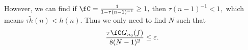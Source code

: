 %
%
%
%
%

However, we can find if $\fC =\frac{1}{1 - \tau (n-1)^{-1}} \ge 1,$ then $\tau (n-1)^{-1} <1,$ which means $ \tau\tilde{h}(n)< h(n).$
Thus we only need to find $N$ such that  \[
\frac{\tau \fC G_{n_{0}}(f)}{8(N-1)^2} \le \varepsilon.
\]

